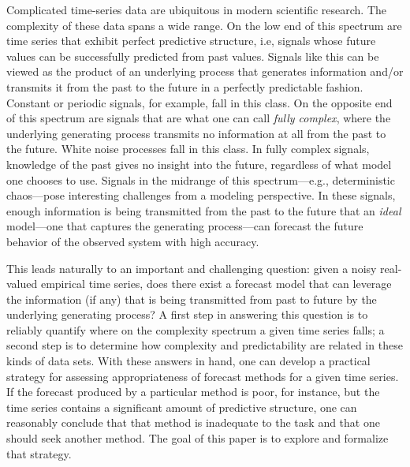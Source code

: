 %
Complicated time-series data are ubiquitous in modern scientific
research.  The complexity of these data spans a wide range.  On the
low end of this spectrum are time series that exhibit perfect
predictive structure, i.e, signals whose future values can be
successfully predicted from past values.  Signals like this can be
viewed as the product of an underlying process that generates
information and/or transmits it from the past to the future in a
perfectly predictable fashion.  Constant or periodic signals, for
example, fall in this class.  On the opposite end of this spectrum are
signals that are what one can call \emph{fully complex}, where the
underlying generating process transmits no information at all from the
past to the future.  White noise processes fall in this class.  In
fully complex signals, knowledge of the past gives no insight into the
future, regardless of what model one chooses to use. Signals in the
midrange of this spectrum---e.g., deterministic chaos---pose
interesting challenges from a modeling perspective.  In these signals,
enough information is being transmitted from the past to the future
that an \emph{ideal} model---one that captures the generating
process---can forecast the future behavior of the observed system with
high accuracy. 


This leads naturally to an important and challenging question: given a
noisy real-valued empirical time series, does there exist a forecast
model that can leverage the information (if any) that is being
transmitted from past to future by the underlying generating process?
A first step in answering this question is to reliably quantify where
on the complexity spectrum a given time series falls; a second step is
to determine how complexity and predictability are related in these
kinds of data sets.  With these answers in hand, one can develop a
practical strategy for assessing appropriateness of forecast methods
for a given time series.  If the forecast produced by a particular
method is poor, for instance, but the time series contains a
significant amount of predictive structure, one can reasonably
conclude that that method is inadequate to the task and that one
should seek another method.  The goal of this paper is to explore and
formalize that strategy.

